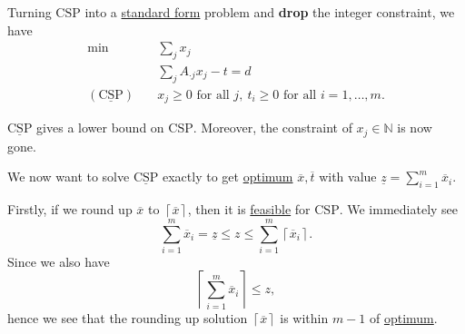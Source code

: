 \begin{answer}
	Turning \(\mathrm{CSP}\) into a \hyperref[def:standard-form]{standard form} problem and \textbf{drop} the integer constraint, we have
	\[
		\begin{aligned}
			\min~                           & \sum\limits_{j} x_{j}                                                         \\
			                                & \sum\limits_{j} A_{\cdot j}x_{j} - t = d                                      \\
			(\mathrm{\underline{CSP}})\quad & x_{j}\geq 0 \text{ for all }j,\ t_{i}\geq 0\text{ for all }i = 1, \ldots , m.
		\end{aligned}
	\]

	\begin{note}
		\(\mathrm{\underline{CSP}}\) gives a lower bound on \(\mathrm{CSP}\). Moreover, the constraint of \(x_{j}\in\mathbb{N}\)
		is now gone.
	\end{note}

	We now want to solve \(\mathrm{\underline{CSP}}\) exactly to get \hyperref[def:optimal-solution]{optimum} \(\overline{x}, \overline{t}\) with value
	\(\underline{z} = \sum\limits_{i=1}^{m} \overline{x}_{i}\).

	Firstly, if we round up \(\overline{x}\) to \(\left\lceil \overline{x} \right\rceil \), then it is \hyperref[def:feasible-solution]{feasible} for \(\mathrm{CSP}\).
	We immediately see
	\[
		\sum\limits_{i=1}^{m} \overline{x}_{i} = \underline{z} \leq z \leq \sum\limits_{i=1}^{m} \left\lceil \overline{x}_{i} \right\rceil.
	\]
	Since we also have
	\[
		\left\lceil \sum\limits_{i=1}^{m} \overline{x}_{i} \right\rceil \leq z,
	\]
	hence we see that the rounding up solution \(\left\lceil \overline{x} \right\rceil \) is within \(m-1\) of \hyperref[def:optimal-solution]{optimum}.


\end{answer}
